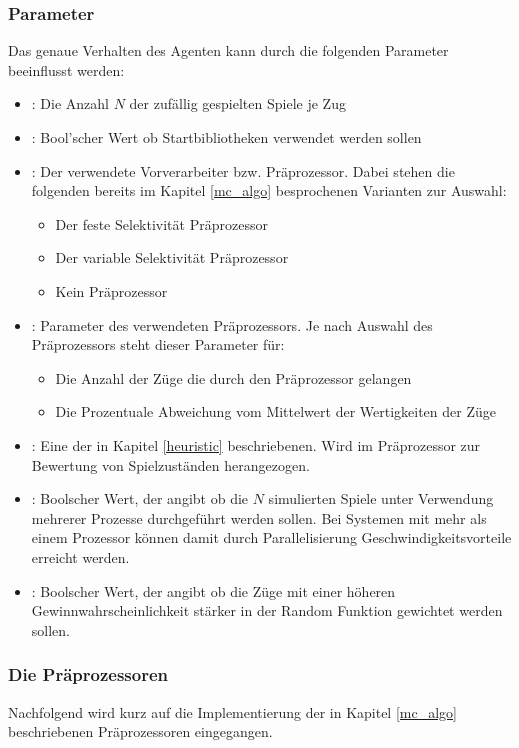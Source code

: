 \subsubsection{Parameter}
\label{mc_params}
Das genaue Verhalten des Agenten kann durch die folgenden Parameter beeinflusst werden: 
\begin{itemize}
\item {}: Die Anzahl $N$ der zufällig gespielten Spiele je Zug
\item {}: Bool'scher Wert ob Startbibliotheken verwendet werden sollen
\item {}: Der verwendete Vorverarbeiter bzw. Präprozessor. Dabei stehen die folgenden bereits im Kapitel \ref{mc_algo} besprochenen Varianten zur Auswahl:
\begin{itemize}
    \item Der feste Selektivität Präprozessor
    \item Der variable Selektivität Präprozessor
    \item Kein Präprozessor
\end{itemize}
\item {}: Parameter des verwendeten Präprozessors. Je nach Auswahl des Präprozessors steht dieser Parameter für:
\begin{itemize}
    \item Die Anzahl der Züge die durch den Präprozessor gelangen
    \item Die Prozentuale Abweichung vom Mittelwert der Wertigkeiten der Züge
\end{itemize}
\item {}: Eine der in  Kapitel \ref{heuristic} beschriebenen. Wird im Präprozessor zur Bewertung von Spielzuständen herangezogen.
\item {}: Boolscher Wert, der angibt ob die $N$ simulierten Spiele unter Verwendung mehrerer Prozesse durchgeführt werden sollen. Bei Systemen mit mehr als einem Prozessor können damit durch Parallelisierung Geschwindigkeitsvorteile erreicht werden. 
\item {}: Boolscher Wert, der angibt ob die Züge mit einer höheren Gewinnwahrscheinlichkeit stärker in der Random Funktion gewichtet werden sollen.
\end{itemize}

\subsubsection{Die Präprozessoren}
Nachfolgend wird kurz auf die Implementierung der in Kapitel \ref{mc_algo} beschriebenen Präprozessoren eingegangen.

